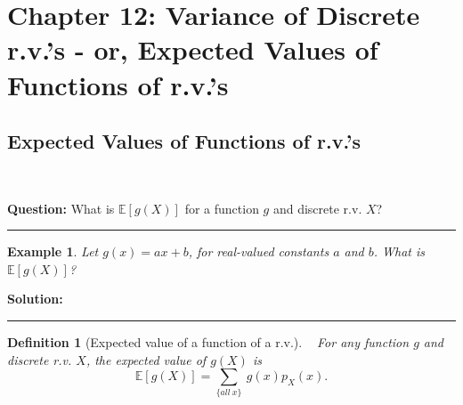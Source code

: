 \documentclass[12pt]{amsart}
\newtheorem{definition}[theorem]{Definition}
\newtheorem{example}[theorem]{Example}
\begin{document}
\setcounter{section}{12}
{\huge  
\section*{Chapter 12: Variance of Discrete r.v.'s - \newline
or, Expected Values of Functions of r.v.'s}
}

{\large 


\subsection{Expected Values of Functions of r.v.'s}\ \newline

\vspace{.5cm}

\textbf{Question:} What is $\mathbb{E}[g(X)]$ for a function $g$ and discrete r.v. $X$?

\vspace{.5cm}
\hrule
\vspace{.5cm}

\begin{example}
Let $g(x) = ax+b$, for real-valued constants $a$ and $b$. \newline
What is $\mathbb{E}[g(X)]$?
\end{example}

\textbf{Solution:}


\vspace{8cm}
\hrule
\vspace{.5cm}




\begin{definition}[Expected value of a function of a r.v.]\label{EfcnX}\ \newline
For any function $g$ and discrete r.v. $X$, the expected value of $g(X)$ is
$$
\mathbb{E}[g(X)] = \sum_{\{all\ x\}}\ g(x) p_X(x).
$$ 
\end{definition}






}
\end{document}

